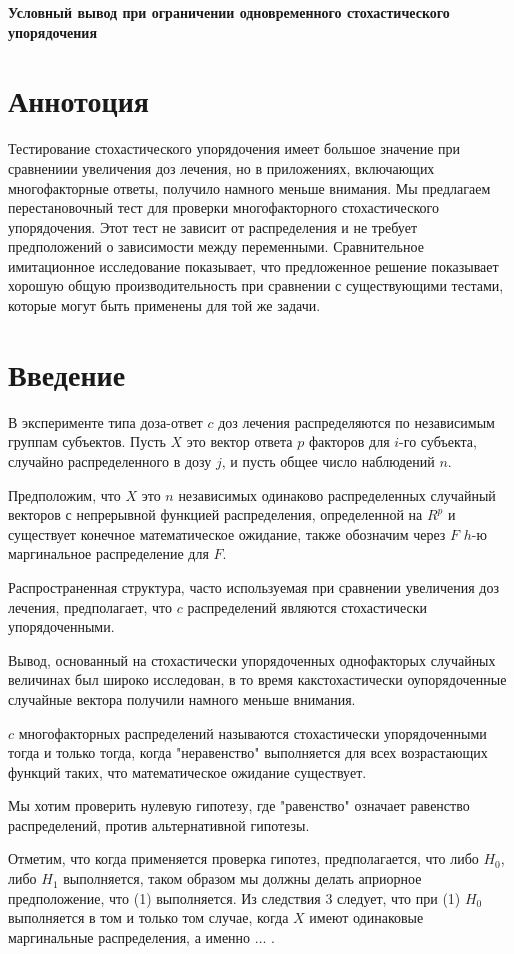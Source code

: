 \documentclass{article}
\begin{document}
\textbf{\huge{Условный вывод при ограничении одновременного стохастического упорядочения}}

\section*{Аннотоция}
Тестирование стохастического упорядочения имеет большое значение при сравнениии увеличения доз лечения, но в приложениях, включающих многофакторные ответы, получило намного меньше внимания. Мы предлагаем перестановочный тест для проверки многофакторного стохастического упорядочения. Этот тест не зависит от распределения и не требует предположений о зависимости между переменными. Сравнительное имитационное исследование показывает, что предложенное решение показывает хорошую общую производительность при сравнении с существующими тестами, которые могут быть применены для той же задачи.

\section{Введение}
В эксперименте типа доза-ответ $c$ доз лечения распределяются по независимым группам субъектов. Пусть $X$ это вектор ответа $p$ факторов для $i$-го субъекта, случайно распределенного в дозу $j$, и пусть общее число наблюдений $n$.

Предположим, что $X$ это $n$ независимых одинаково распределенных случайный векторов с непрерывной функцией распределения, определенной на $R^p$ и существует конечное математическое ожидание, также обозначим через $F$ $h$-ю маргинальное распределение для $F$.

Распространенная структура, часто используемая при сравнении увеличения доз лечения, предполагает, что $c$ распределений являются стохастически упорядоченными.

Вывод, основанный на стохастически упорядоченных однофакторых случайных величинах был широко исследован, в то время какстохастически оупорядоченные случайные вектора получили намного меньше внимания.

$c$ многофакторных распределений называются стохастически упорядоченными тогда и только тогда, когда "неравенство" выполняется для всех возрастающих функций таких, что математическое ожидание существует.

Мы хотим проверить нулевую гипотезу, где "равенство" означает равенство распределений, против альтернативной гипотезы.

Отметим, что когда применяется проверка гипотез, предполагается, что либо $H_0$, либо $H_1$ выполняется, таком образом мы должны делать априорное предположение, что (1) выполняется. Из следствия 3 следует, что при (1) $H_0$ выполняется в том и только том случае, когда $X$ имеют одинаковые маргинальные распределения, а именно ... .
\end{document}
